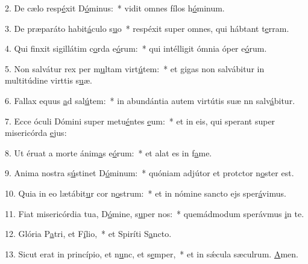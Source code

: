 2. De cælo resp\uline{é}xit D\uline{ó}minus:~* vidit omnes fílos h\uline{ó}minum.\par 
3. De præparáto habit\uline{á}culo s\uline{u}o~* respéxit super omnes, qui hábtant t\uline{e}rram.\par 
4. Qui finxit sigillátim c\uline{o}rda e\uline{ó}rum:~* qui intélligit ómnia óper e\uline{ó}rum.\par 
5. Non salvátur rex per m\uline{u}ltam virt\uline{ú}tem:~* et gigas non salvábitur in multitúdine virttis s\uline{u}æ.\par 
6. Fallax equus \uline{a}d sal\uline{ú}tem:~* in abundántia autem virtútis suæ nn salv\uline{á}bitur.\par 
7. Ecce óculi Dómini super metu\uline{é}ntes \uline{e}um:~* et in eis, qui sperant super misericórda \uline{e}jus:\par 
8. Ut éruat a morte ánim\uline{a}s e\uline{ó}rum:~* et alat es in f\uline{a}me.\par 
9. Anima nostra s\uline{ú}stinet D\uline{ó}minum:~* quóniam adjútor et protctor n\uline{o}ster est.\par 
10. Quia in eo lætábit\uline{u}r cor n\uline{o}strum:~* et in nómine sancto ejs sper\uline{á}vimus.\par 
11. Fiat misericórdia tua, D\uline{ó}mine, s\uline{u}per nos:~* quemádmodum sperávmus \uline{i}n te.\par 
12. Glória P\uline{a}tri, et F\uline{í}lio,~* et Spiríti S\uline{a}ncto.\par 
13. Sicut erat in princípio, et n\uline{u}nc, et s\uline{e}mper,~* et in sǽcula sæculrum. \uline{A}men.\par 
